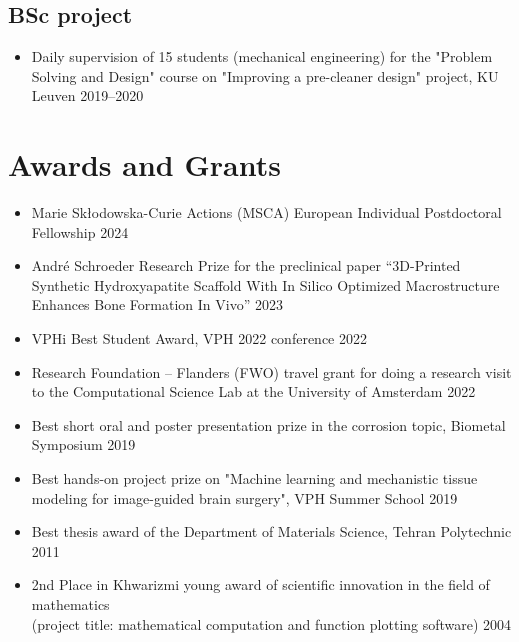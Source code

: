 \documentclass{cv}
\begin{document}
\subsection{BSc project}

\begin{itemize}[itemsep=-0.2ex]
\item
Daily supervision of 15 students (mechanical engineering) for the "Problem Solving and Design" course on "Improving a pre-cleaner design" project, KU Leuven \hfill 2019--2020
\end{itemize}



\section{Awards and Grants}

\begin{itemize}[itemsep=-0.2ex]
\item
Marie Skłodowska-Curie Actions (MSCA) European Individual Postdoctoral Fellowship \hfill 2024
\item
André Schroeder Research Prize for the preclinical paper ``3D-Printed Synthetic Hydroxyapatite Scaffold With In Silico Optimized Macrostructure Enhances Bone Formation In Vivo'' \hfill 2023
\item 
VPHi Best Student Award, VPH 2022 conference \hfill 2022
\item
Research Foundation – Flanders (FWO) travel grant for doing a research visit to the Computational Science Lab at the University of Amsterdam \hfill 2022
\item
Best short oral and poster presentation prize in the corrosion topic, Biometal Symposium \hfill 2019
\item
Best hands-on project prize on "Machine learning and mechanistic tissue modeling for image-guided brain surgery", VPH Summer School \hfill 2019
\item
Best thesis award of the Department of Materials Science, Tehran Polytechnic \hfill 2011
\item
2nd Place in Khwarizmi young award of scientific innovation in the field of mathematics\\(project title: mathematical computation and function plotting software) \hfill 2004
\end{itemize}



\end{document}
